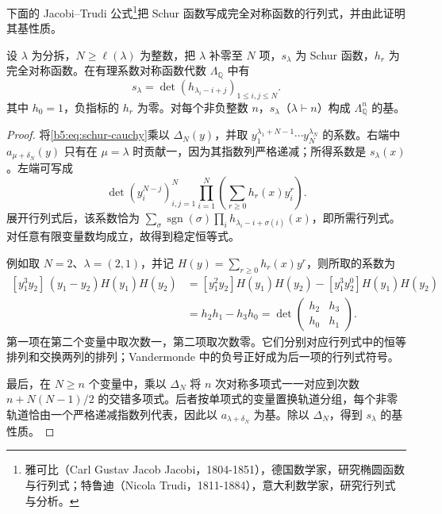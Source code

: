 下面的 Jacobi--Trudi 公式\footnote{雅可比（Carl Gustav Jacob Jacobi，1804-1851），德国数学家，研究椭圆函数与行列式；特鲁迪（Nicola Trudi，1811-1884），意大利数学家，研究行列式与分析。}把 Schur 函数写成完全对称函数的行列式，并由此证明其基性质。

\begin{theorem}\label{b5:thm:jacobi-trudi}
	设 \(\lambda\) 为分拆，\(N\ge\ell(\lambda)\) 为整数，把 \(\lambda\) 补零至 \(N\) 项，\(s_\lambda\) 为 Schur 函数，\(h_r\) 为完全对称函数。在有理系数对称函数代数 \(\Lambda_{\mathbb Q}\) 中有
	\begin{equation}\label{b5:eq:jacobi-trudi}
		s_\lambda=\det(h_{\lambda_i-i+j})_{1\le i,j\le N}.
	\end{equation}
	其中 \(h_0=1\)，负指标的 \(h_r\) 为零。对每个非负整数 \(n\)，\(s_\lambda\)（\(\lambda\vdash n\)）构成 \(\Lambda_{\mathbb Q}^n\) 的基。
\end{theorem}
\begin{proof}
	将\eqref{b5:eq:schur-cauchy}乘以 \(\Delta_N(y)\)，并取 \(y_1^{\lambda_1+N-1}\cdots y_N^{\lambda_N}\) 的系数。右端中 \(a_{\mu+\delta_N}(y)\) 只有在 \(\mu=\lambda\) 时贡献一，因为其指数列严格递减；所得系数是 \(s_\lambda(x)\)。左端可写成
	\[
		\det(y_i^{N-j})_{i,j=1}^N\prod_{i=1}^N \left(\sum_{r\ge0}h_r(x)y_i^r\right).
	\]
	展开行列式后，该系数恰为 \(\sum_\sigma\operatorname{sgn}(\sigma)\prod_i h_{\lambda_i-i+\sigma(i)}(x)\)，即所需行列式。对任意有限变量数均成立，故得到稳定恒等式。

	例如取 \(N=2\)、\(\lambda=(2,1)\)，并记 \(H(y)=\sum_{r\ge0}h_r(x)y^r\)，则所取的系数为
	\[
		\begin{aligned}
			[y_1^3y_2]\,(y_1-y_2)H(y_1)H(y_2) &=[y_1^2y_2]H(y_1)H(y_2) -[y_1^3y_2^0]H(y_1)H(y_2)\\
			&=h_2h_1-h_3h_0
			=\det\begin{pmatrix}h_2&h_3\\h_0&h_1\end{pmatrix}.
		\end{aligned}
	\]
	第一项在第二个变量中取次数一，第二项取次数零。它们分别对应行列式中的恒等排列和交换两列的排列；Vandermonde 中的负号正好成为后一项的行列式符号。

	最后，在 \(N\ge n\) 个变量中，乘以 \(\Delta_N\) 将 \(n\) 次对称多项式一一对应到次数 \(n+N(N-1)/2\) 的交错多项式。后者按单项式的变量置换轨道分组，每个非零轨道恰由一个严格递减指数列代表，因此以 \(a_{\lambda+\delta_N}\) 为基。除以 \(\Delta_N\)，得到 \(s_\lambda\) 的基性质。
\end{proof}

